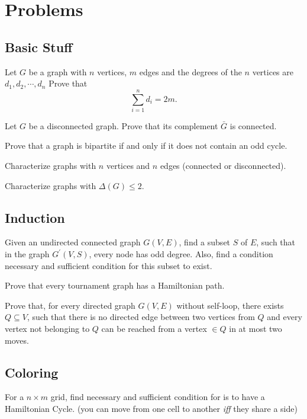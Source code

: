 \documentclass[a4paper, 10pt]{article}
\begin{document}
  \section{Problems}
  \subsection{Basic Stuff}
  \begin{problem}
    \label{degree-sum}
    Let $G$ be a graph with $n$ vertices, $m$ edges and the degrees of the
    $n$ vertices are $d_{1}, d_{2}, \cdots, d_{n}$ Prove that
    \[
      \sum_{i=1}^{n} d_{i}=2 m
    .\]
  \end{problem}
  \begin{problem}
    Let $G$ be a disconnected graph. Prove that its complement $\bar{G}$ is
    connected.
  \end{problem}
  \begin{problem}
    Prove that a graph is bipartite if and only if it does not contain an odd
    cycle.
  \end{problem}
  \begin{problem}
    Characterize graphs with $n$ vertices and $n$ edges (connected or
    disconnected).
  \end{problem}
  \begin{problem}
    Characterize graphs with $\Delta(G) \le 2$.
  \end{problem}

  \subsection{Induction}
  \begin{problem}
    Given an undirected connected graph $G(V, E)$, find a subset $S$ of $E$,
    such that in the graph $G^\prime(V, S)$, every node has odd degree. Also,
    find a condition necessary and sufficient condition for this subset to
    exist.
  \end{problem}
  \begin{problem}
    Prove that every tournament graph has a Hamiltonian path.
  \end{problem}
  \begin{problem}
    Prove that, for every directed graph $G(V, E)$ without self-loop, there
    exists $Q \subseteq V$, such that there is no directed edge between two
    vertices from $Q$ and every vertex not belonging to $Q$ can be reached
    from a vertex $\in Q$ in at most two moves.
  \end{problem}

  \subsection{Coloring}
  \begin{problem}
    For a $n \times m$ grid, find necessary and sufficient condition for is
    to have a Hamiltonian Cycle. (you can move from one cell to another
    \textit{iff} they share a side)
  \end{problem}
\end{document}

